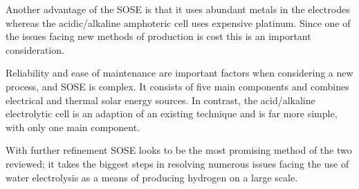 Another advantage of the SOSE is that it uses abundant metals in the electrodes whereas the acidic/alkaline amphoteric cell uses expensive platinum.
Since one of the issues facing new methods of  production is cost this is an important consideration.

Reliability and ease of maintenance are important factors when considering a new process, and SOSE is complex.
It consists of five main components and combines electrical and thermal solar energy sources.
In contrast, the acid/alkaline electrolytic cell is an adaption of an existing technique and is far more simple, with only one main component.

With further refinement SOSE looks to be the most promising method of the two reviewed; it takes the biggest steps in resolving numerous issues facing the use of water electrolysis as a means of producing hydrogen on a large scale.


